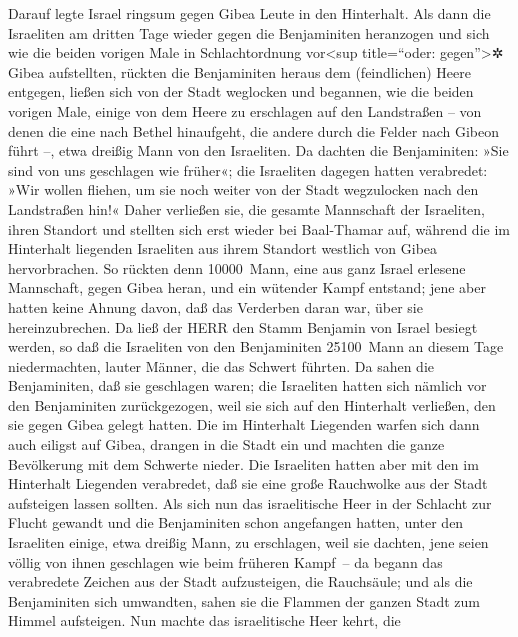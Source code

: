 Darauf legte Israel ringsum gegen Gibea Leute in den
Hinterhalt. Als dann die Israeliten am dritten Tage
wieder gegen die Benjaminiten heranzogen und sich wie die beiden vorigen
Male in Schlachtordnung vor\textless sup title=``oder:
gegen''\textgreater✲ Gibea aufstellten, rückten die
Benjaminiten heraus dem (feindlichen) Heere entgegen, ließen sich von
der Stadt weglocken und begannen, wie die beiden vorigen Male, einige
von dem Heere zu erschlagen auf den Landstraßen -- von denen die eine
nach Bethel hinaufgeht, die andere durch die Felder nach Gibeon führt
--, etwa dreißig Mann von den Israeliten. Da dachten die
Benjaminiten: »Sie sind von uns geschlagen wie früher«; die Israeliten
dagegen hatten verabredet: »Wir wollen fliehen, um sie noch weiter von
der Stadt wegzulocken nach den Landstraßen hin!« Daher
verließen sie, die gesamte Mannschaft der Israeliten, ihren Standort und
stellten sich erst wieder bei Baal-Thamar auf, während die im Hinterhalt
liegenden Israeliten aus ihrem Standort westlich von Gibea
hervorbrachen. So rückten denn 10000~Mann, eine aus ganz
Israel erlesene Mannschaft, gegen Gibea heran, und ein wütender Kampf
entstand; jene aber hatten keine Ahnung davon, daß das Verderben daran
war, über sie hereinzubrechen. Da ließ der HERR den Stamm
Benjamin von Israel besiegt werden, so daß die Israeliten von den
Benjaminiten 25100~Mann an diesem Tage niedermachten, lauter Männer, die
das Schwert führten. Da sahen die Benjaminiten, daß sie
geschlagen waren; die Israeliten hatten sich nämlich vor den
Benjaminiten zurückgezogen, weil sie sich auf den Hinterhalt verließen,
den sie gegen Gibea gelegt hatten. Die im Hinterhalt
Liegenden warfen sich dann auch eiligst auf Gibea, drangen in die Stadt
ein und machten die ganze Bevölkerung mit dem Schwerte nieder.
Die Israeliten hatten aber mit den im Hinterhalt
Liegenden verabredet, daß sie eine große Rauchwolke aus der Stadt
aufsteigen lassen sollten. Als sich nun das israelitische
Heer in der Schlacht zur Flucht gewandt und die Benjaminiten schon
angefangen hatten, unter den Israeliten einige, etwa dreißig Mann, zu
erschlagen, weil sie dachten, jene seien völlig von ihnen geschlagen wie
beim früheren Kampf~-- da begann das verabredete Zeichen
aus der Stadt aufzusteigen, die Rauchsäule; und als die Benjaminiten
sich umwandten, sahen sie die Flammen der ganzen Stadt zum Himmel
aufsteigen. Nun machte das israelitische Heer kehrt, die
